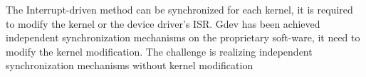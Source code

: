 The Interrupt-driven method can be synchronized for each kernel, it is required to modify the kernel or the device driver's ISR.
Gdev has been achieved independent synchronization mechanisms on the proprietary soft-ware, it need to modify the kernel modification.
The challenge is realizing independent synchronization mechanisms without kernel modification

